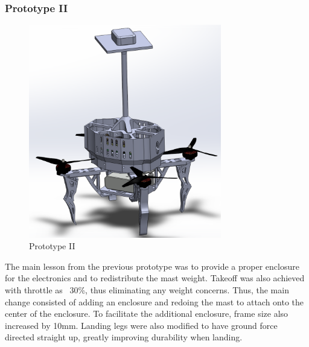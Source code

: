 \documentclass{article}
\begin{document}
\clearpage

\subsubsection{Prototype II}

\begin{figure}[h!]
  \begin{center} 
  \caption{Prototype II}
  \label{fig:PrototypeII}
        \includegraphics[width=0.75\textwidth]{Reflection/PrototypeII.png}
  \end{center}
\end{figure}

The main lesson from the previous prototype was to provide a proper enclosure for the electronics and to redistribute the mast weight. Takeoff was also achieved with throttle as ~30\%, thus eliminating any weight concerns. Thus, the main change consisted of adding an enclosure and redoing the mast to attach onto the center of the enclosure. To facilitate the additional enclosure, frame size also increased by 10mm. Landing legs were also modified to have ground force directed straight up, greatly improving durability when landing.
\end{document}
